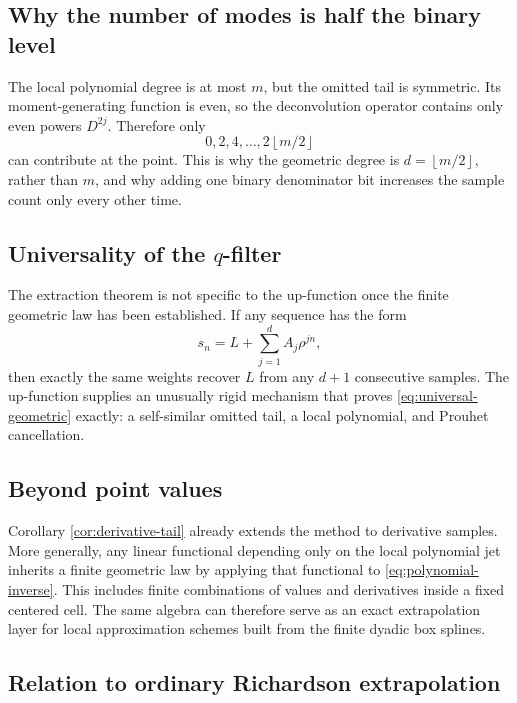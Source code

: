 \documentclass[11pt,oneside]{article}
\theoremstyle{definition}
\theoremstyle{remark}
\newcommand{\floor}[1]{\left\lfloor#1\right\rfloor}
\begin{document}
\subsection{Why the number of modes is half the binary level}

The local polynomial degree is at most \(m\), but the omitted tail is symmetric.
Its moment-generating function is even, so the deconvolution operator contains
only even powers \(D^{2j}\).  Therefore only
\[
 0,2,4,\ldots,2\floor{m/2}
\]
can contribute at the point.  This is why the geometric degree is
\(d=\floor{m/2}\), rather than \(m\), and why adding one binary denominator
bit increases the sample count only every other time.

\subsection{Universality of the \texorpdfstring{$q$}{q}-filter}

The extraction theorem is not specific to the up-function once the finite
geometric law has been established.  If any sequence has the form
\begin{equation}\label{eq:universal-geometric}
 s_n=L+\sum_{j=1}^{d}A_j\rho^{jn},
\end{equation}
then exactly the same weights recover \(L\) from any \(d+1\) consecutive
samples.  The up-function supplies an unusually rigid mechanism that proves
\eqref{eq:universal-geometric} exactly: a self-similar omitted tail, a local
polynomial, and Prouhet cancellation.

\subsection{Beyond point values}

Corollary \ref{cor:derivative-tail} already extends the method to derivative
samples.  More generally, any linear functional depending only on the local
polynomial jet inherits a finite geometric law by applying that functional to
\eqref{eq:polynomial-inverse}.  This includes finite combinations of values
and derivatives inside a fixed centered cell.  The same algebra can therefore
serve as an exact extrapolation layer for local approximation schemes built
from the finite dyadic box splines.

\subsection{Relation to ordinary Richardson extrapolation}
\end{document}
